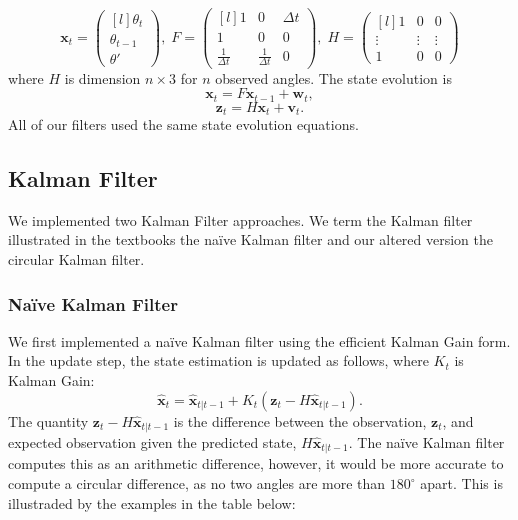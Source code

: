 \documentclass[11pt]{amsart}
\begin{document}
\[\mathbf{x}_t = \begin{pmatrix*}[l]
    \theta_t \\
    \theta_{t-1} \\
    \theta'
\end{pmatrix*},\;  
F = \begin{pmatrix*}[l]
    1 & 0 & \Delta t \\
    1 & 0 & 0 \\
    \frac{1}{\Delta t} & \frac{1}{\Delta t} & 0
\end{pmatrix*},\;
H = \begin{pmatrix*}[l]
    1 & 0 & 0 \\
    \vdots & \vdots & \vdots\\
    1 & 0 & 0

\end{pmatrix*}\]
 where $H$ is dimension $n\times3$ for $n$ observed angles. The state evolution is
 \[\mathbf{x}_t = F\mathbf{x}_{t-1} + \mathbf{w}_t,\]
\[\mathbf{z}_t = H\mathbf{x}_t + \mathbf{v}_t.\]
All of our filters used the same state evolution equations.

\subsection{Kalman Filter}
We implemented two Kalman Filter \cite{V3}\cite{V3 Lab Manual} approaches. We term the Kalman filter illustrated in the textbooks the naïve Kalman filter and our altered version the circular Kalman filter.

\subsubsection{Naïve Kalman Filter}
We first implemented a naïve Kalman filter using the efficient Kalman Gain form. In the update step, the state estimation is updated as follows, where $K_t$ is Kalman Gain: \[\mathbf{\hat{x}}_t = \mathbf{\hat{x}}_{t|t-1} + K_t(\mathbf{z}_t - H\mathbf{\hat{x}}_{t|t-1}).\] The quantity $\mathbf{z}_t - H\mathbf{\hat{x}}_{t|t-1}$ is the difference between the observation, $\mathbf{z}_t$, and expected observation given the predicted state, $H\mathbf{\hat{x}}_{t|t-1}$. The naïve Kalman filter computes this as an arithmetic difference, however, it would be more accurate to compute a circular difference, as no two angles are more than $180^{\circ}$ apart. This is illustraded by the examples in the table below:
\end{document}
